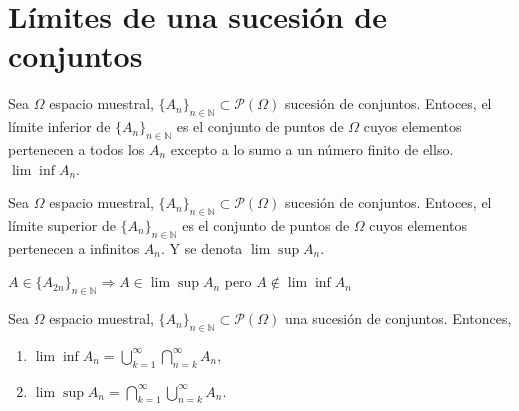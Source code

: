\section{Límites de una sucesión de conjuntos}

\begin{defn}
  Sea $\Omega$ espacio muestral, $\{ A_{n} \}_{n \in \mathbb{N}} \subset \mathcal{P}(\Omega)$ sucesión de conjuntos. Entoces, el límite inferior de $\{ A_{n} \}_{n \in \mathbb{N}}$ es el conjunto de puntos de $\Omega$ cuyos elementos pertenecen a todos los $A_{n}$ excepto a lo sumo a un número finito de ellso. $\lim \inf A_{n}$.
\end{defn}

\begin{defn}
  Sea $\Omega$ espacio muestral, $\{ A_{n} \}_{n \in \mathbb{N}} \subset \mathcal{P}(\Omega)$ sucesión de conjuntos. Entoces, el límite superior de $\{ A_{n} \}_{n \in \mathbb{N}}$ es el conjunto de puntos de $\Omega$ cuyos elementos pertenecen a infinitos $A_{n}$. Y se denota $\lim \sup A_{n}$.
\end{defn}

\begin{obs}
  $A \in \{ A_{2n} \}_{n \in \mathbb{N}} \Rightarrow A \in \lim \sup A_{n}$ pero $A \not \in \lim \inf A_{n}$
\end{obs}

\begin{prop}
  Sea $\Omega$ espacio muestral, $\{ A_{n} \}_{n \in \mathbb{N}} \subset \mathcal{P}(\Omega)$ una sucesión de conjuntos. Entonces,
  \begin{enumerate}[label=(\roman*)]
    \item $\lim \inf A_n = \bigcup_{k=1}^{\infty} \bigcap_{n=k}^{\infty} A_{n}$,
    \item $\lim \sup A_n = \bigcap_{k=1}^{\infty} \bigcup_{n=k}^{\infty} A_{n}$.
  \end{enumerate}
\end{prop}


